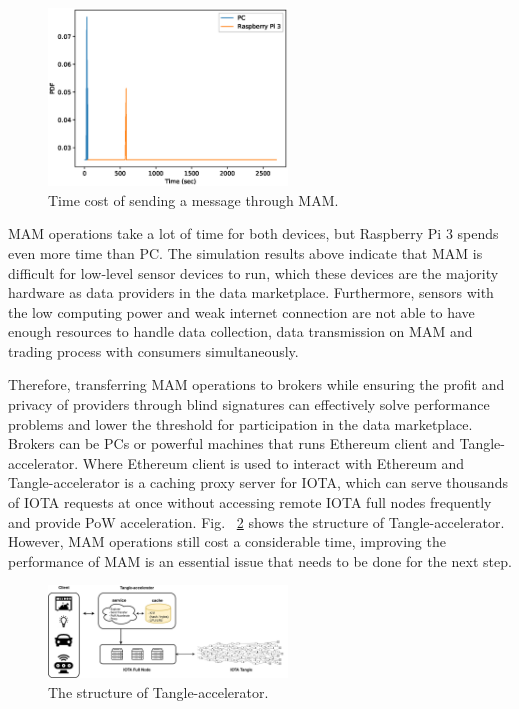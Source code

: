 \documentclass[conference]{IEEEtran}
\begin{document}
\begin{figure}[!t]
    \centering
    \includegraphics[width=2.5in]{mam_send}
    \caption{Time cost of sending a message through MAM.}
    \label{fig:mam_send}
\end{figure}

MAM operations take a lot of time for both devices, but Raspberry Pi 3 spends even more time than PC. The simulation results above indicate that MAM is difficult for low-level sensor devices to run, which these devices are the majority hardware as data providers in the data marketplace. Furthermore, sensors with the low computing power and weak internet connection are not able to have enough resources to handle data collection, data transmission on MAM and trading process with consumers simultaneously. 

Therefore, transferring MAM operations to brokers while ensuring the profit and privacy of providers through blind signatures can effectively solve performance problems and lower the threshold for participation in the data marketplace. Brokers can be PCs or powerful machines that runs Ethereum client and Tangle-accelerator\cite{TA}. Where Ethereum client is used to interact with Ethereum and Tangle-accelerator is a caching proxy server for IOTA, which can serve thousands of IOTA requests at once without accessing remote IOTA full nodes frequently and provide PoW acceleration. Fig.~ \ref{fig:ta_struct} shows the structure of Tangle-accelerator. However, MAM operations still cost a considerable time, improving the performance of MAM is an essential issue that needs to be done for the next step.  

\begin{figure}[!t]
    \centering
    \includegraphics[width=2.5in]{ta_structure}
    \caption{The structure of Tangle-accelerator.}
    \label{fig:ta_struct}
\end{figure}
\end{document}

